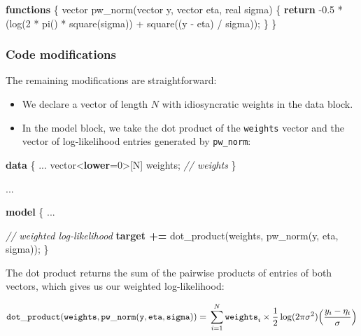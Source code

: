 \documentclass[
  11pt,
]{article}
\newenvironment{Shaded}{\begin{snugshade}}{\end{snugshade}}
\newcommand{\CommentTok}[1]{\textcolor[rgb]{0.56,0.35,0.01}{\textit{#1}}}
\newcommand{\ControlFlowTok}[1]{\textcolor[rgb]{0.13,0.29,0.53}{\textbf{#1}}}
\newcommand{\DataTypeTok}[1]{\textcolor[rgb]{0.13,0.29,0.53}{#1}}
\newcommand{\DecValTok}[1]{\textcolor[rgb]{0.00,0.00,0.81}{#1}}
\newcommand{\FloatTok}[1]{\textcolor[rgb]{0.00,0.00,0.81}{#1}}
\newcommand{\KeywordTok}[1]{\textcolor[rgb]{0.13,0.29,0.53}{\textbf{#1}}}
\newcommand{\NormalTok}[1]{#1}
\providecommand{\tightlist}{%
  \setlength{\itemsep}{0pt}\setlength{\parskip}{0pt}}
\begin{document}
\begin{Shaded}
\begin{Highlighting}[]
\KeywordTok{functions}\NormalTok{ \{}
  \DataTypeTok{vector}\NormalTok{ pw\_norm(}\DataTypeTok{vector}\NormalTok{ y, }\DataTypeTok{vector}\NormalTok{ eta, }\DataTypeTok{real}\NormalTok{ sigma) \{}
    \ControlFlowTok{return}\NormalTok{ {-}}\FloatTok{0.5}\NormalTok{ * (log(}\DecValTok{2}\NormalTok{ * pi() * square(sigma)) + }
\NormalTok{                     square((y {-} eta) / sigma));}
\NormalTok{  \}}
\NormalTok{\}}
\end{Highlighting}
\end{Shaded}

\hypertarget{code-modifications}{%
\subsubsection{Code modifications}\label{code-modifications}}

The remaining modifications are straightforward:

\begin{itemize}
\tightlist
\item
  We declare a vector of length \(N\) with idiosyncratic weights in the data block.
\item
  In the model block, we take the dot product of the \texttt{weights} vector and the vector of log-likelihood entries generated by \texttt{pw\_norm}:
\end{itemize}

\begin{Shaded}
\begin{Highlighting}[]
\KeywordTok{data}\NormalTok{ \{}
\NormalTok{  ...}
  \DataTypeTok{vector}\NormalTok{\textless{}}\KeywordTok{lower}\NormalTok{=}\DecValTok{0}\NormalTok{\textgreater{}[N] weights;  }\CommentTok{// weights}
\NormalTok{\}}

\NormalTok{...}

\KeywordTok{model}\NormalTok{ \{}
\NormalTok{  ...}
  
  \CommentTok{// weighted log{-}likelihood}
  \KeywordTok{target +=}\NormalTok{ dot\_product(weights, pw\_norm(y, eta, sigma));}
\NormalTok{\}}
\end{Highlighting}
\end{Shaded}

The dot product returns the sum of the pairwise products of entries of both vectors, which gives us our weighted log-likelihood:

\[\mathtt{dot\_product(weights, pw\_norm(y, eta, sigma))} = \\ \sum_{i=1}^{N}\mathtt{weights}_i \times \frac{1}{2} \log (2 \pi \sigma^2) \Big( \frac{y_i-\eta_i}{\sigma}\Big)\]
\end{document}
